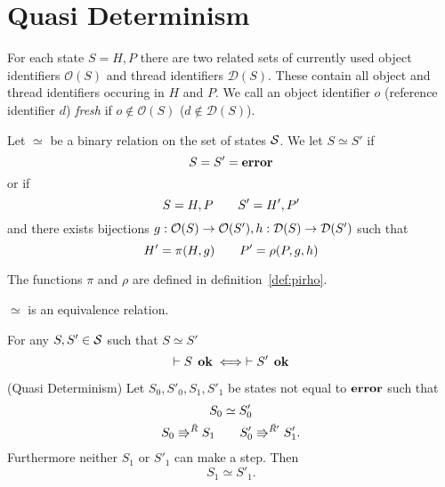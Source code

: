 \chapter{Quasi Determinism}
\label{cha:determinism}


\begin{definition}
  For each state $S = H, P$ there are two related sets of currently used object
  identifiers $\mathcal{O}(S)$ and thread identifiers $\mathcal{D}(S)$. These contain
  all object and thread identifiers occuring in $H$ and $P$. We call an object
  identifier $o$ (reference identifier $d$) \emph{fresh} if $o \not\in \mathcal{O}(S)$ ($d \not\in
  \mathcal{D}(S)$).
\end{definition}

\begin{definition} \label{def:eqrel}
  Let $\simeq$ be a binary relation on the set of states $\mathcal{S}$.
  We let $S \simeq S'$ if
  \begin{equation*}
    S = S' = \mbox{{\bf error}}
  \end{equation*}
  or if
  \begin{equation}
    S = H, P \quad\quad S' = H', P'
  \end{equation}
  and there exists bijections $g: \mathcal{O}(S) \to \mathcal{O}(S'), h: \mathcal{D}(S) \to \mathcal{D}(S')$
  such that
  \begin{equation}
    H' = \pi(H, g) \quad\quad P' = \rho(P, g, h)
  \end{equation}
  
  The functions $\pi$ and $\rho$ are defined in definition~\ref{def:pirho}.
\end{definition}



\begin{proposition} \label{prop:eqrel}
  $\simeq$ is an equivalence relation.
\end{proposition}

\begin{proposition} \label{prop:eqrel_stateok}
  For any $S, S' \in \mathcal{S}$ such that $S \simeq S'$
  \begin{equation}
    \vdash S \:\: \mbox{\bf ok} \iff \vdash S' \:\: \mbox{\bf ok}
  \end{equation}
\end{proposition}


\begin{theorem}{(Quasi Determinism)}
  Let $S_0, S'_0, S_1, S'_1$ be states not equal to $\mbox{{\bf error}}$ such that
  \begin{equation*}
    \begin{gathered}
      S_0 \simeq S'_0 \\
      S_0 \Rrightarrow^{\bar{R}} S_1 \quad\quad S'_0 \Rrightarrow^{\bar{R'}} S'_1.
    \end{gathered}
  \end{equation*}
  Furthermore neither $S_1$ or $S'_1$ can make a step.
  Then
  \begin{equation*}
    S_1 \simeq S'_1.
  \end{equation*}
\end{theorem}

